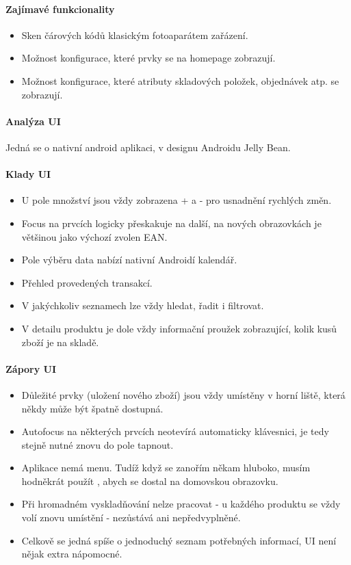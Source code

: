 \paragraph{Zajímavé funkcionality}
\begin{itemize}
	\item Sken čárových kódů klasickým fotoaparátem zařázení.
	\item Možnost konfigurace, které prvky se na homepage zobrazují.
	\item Možnost konfigurace, které atributy skladových položek, objednávek atp. se zobrazují.
\end{itemize}

\paragraph{Analýza UI} Jedná se o nativní android aplikaci, v designu Androidu Jelly Bean. 

\paragraph{Klady UI}
\begin{itemize}
	\item U pole množství jsou vždy zobrazena + a - pro usnadnění rychlých změn.
	\item Focus na prvcích logicky přeskakuje na další, na nových obrazovkách je většinou jako výchozí zvolen EAN.
	\item Pole výběru data nabízí nativní Androidí kalendář.
	\item Přehled provedených transakcí.
	\item V jakýchkoliv seznamech lze vždy hledat, řadit i filtrovat.
	\item V detailu produktu je dole vždy informační proužek zobrazující, kolik kusů zboží je na skladě.
\end{itemize}

\paragraph{Zápory UI}
\begin{itemize}
	\item Důležité prvky (uložení nového zboží) jsou vždy umístěny v horní liště, která někdy může být špatně dostupná.
	\item Autofocus na některých prvcích neotevírá automaticky klávesnici, je tedy stejně nutné znovu do pole tapnout.
	\item Aplikace nemá menu. Tudíž když se zanořím někam hluboko, musím hodněkrát použít , abych se dostal na domovskou obrazovku.
	\item Při hromadném vyskladňování nelze pracovat  - u každého produktu se vždy volí znovu umístění - nezůstává ani nepředvyplněné.
	\item Celkově se jedná spíše o jednoduchý seznam potřebných informací, UI není nějak extra nápomocné.
\end{itemize}

